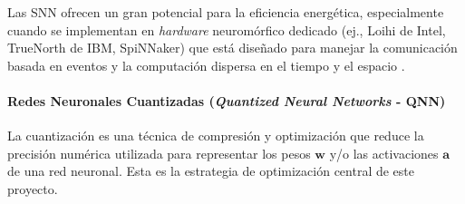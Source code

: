 \documentclass[12pt]{article}
\begin{document}
Las SNN ofrecen un gran potencial para la eficiencia energética, especialmente cuando se implementan en \textit{hardware} neuromórfico dedicado (ej., Loihi de Intel, TrueNorth de IBM, SpiNNaker) que está diseñado para manejar la comunicación basada en eventos y la computación dispersa en el tiempo y el espacio \cite{intel2021loihi2}.

\paragraph{Redes Neuronales Cuantizadas (\textit{Quantized Neural Networks} - QNN)}
\label{sssec:qnn_exp}
La cuantización es una técnica de compresión y optimización que reduce la precisión numérica utilizada para representar los pesos $\bm{w}$ y/o las activaciones $\bm{a}$ de una red neuronal. Esta es la estrategia de optimización central de este proyecto.
\end{document}
